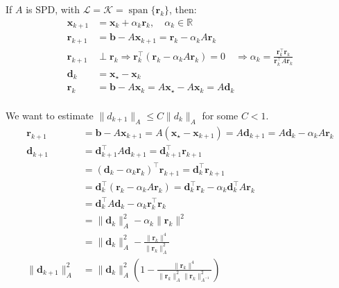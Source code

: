 \documentclass[../../main.tex]{subfiles}
\begin{document}
\begin{example}{}{}
    If $A$ is SPD, with $\mathcal{L} = \mathcal{K} = \operatorname{span}\{\mathbf{r}_k\}$, then:
    \begin{align*}
        \mathbf{x}_{k+1} & = \mathbf{x}_k + \alpha_k \mathbf{r}_k, \quad \alpha_k  \in  \mathbb{R}             \\
        \mathbf{r}_{k+1} & = \mathbf{b} - A \mathbf{x}_{k+1} = \mathbf{r}_k - \alpha_k A \mathbf{r}_k                   \\
        \mathbf{r}_{k+1} & \perp \mathbf{r}_k \Rightarrow \mathbf{r}_k^{\top} (\mathbf{r}_k - \alpha_k A \mathbf{r}_k) = 0 \quad
        \Rightarrow \alpha_k = \frac{\mathbf{r}_k^{\top} \mathbf{r}_k}{\mathbf{r}_k^{\top} A \mathbf{r}_k}              \\
        \mathbf{d}_k     & = \mathbf{x}_\star - \mathbf{x}_k                                                   \\
        \mathbf{r}_k     & = \mathbf{b} - A \mathbf{x}_k = A \mathbf{x}_\star - A \mathbf{x}_k = A \mathbf{d}_k                  \\
    \end{align*}

    We want to estimate $\|d_{k+1}\|_A \leq C \|d_k\|_A$ for some $C < 1$.
    \begin{align*}
        \mathbf{r}_{k+1}         & = \mathbf{b} - A \mathbf{x}_{k+1} = A(\mathbf{x}_\star - \mathbf{x}_{k+1}) = A \mathbf{d}_{k+1} = A \mathbf{d}_k - \alpha_k A \mathbf{r}_k \\
        \mathbf{d}_{k+1}         & = \mathbf{d}_{k+1}^{\top} A \mathbf{d}_{k+1} = \mathbf{d}_{k+1}^{\top} \mathbf{r}_{k+1}                                 \\
                        & = (\mathbf{d}_k - \alpha_k \mathbf{r}_k)^{\top} \mathbf{r}_{k+1} = \mathbf{d}_k^{\top} \mathbf{r}_{k+1}                          \\
                        & = \mathbf{d}_k^{\top} (\mathbf{r}_k - \alpha_k A \mathbf{r}_k) = \mathbf{d}_k^{\top} \mathbf{r}_k - \alpha_k \mathbf{d}_k^{\top} A \mathbf{r}_k    \\
                        & = \mathbf{d}_k^{\top} A \mathbf{d}_k - \alpha_k \mathbf{r}_k^{\top} \mathbf{r}_k                                        \\
                        & = \|\mathbf{d}_k\|_A^2 - \alpha_k \|\mathbf{r}_k\|^2                                                   \\
                        & = \|\mathbf{d}_k\|_A^2 - \frac{\|\mathbf{r}_k\|^4}{\|\mathbf{r}_k\|_A^2}                                        \\
        \|\mathbf{d}_{k+1}\|_A^2 & = \|\mathbf{d}_k\|_A^2\left(1 - \frac{\|\mathbf{r}_k\|^4}{\|\mathbf{r}_k\|_A^2 \|\mathbf{r}_k\|_{A^{-1}}^2}\right)
    \end{align*}
\end{example}
\end{document}
